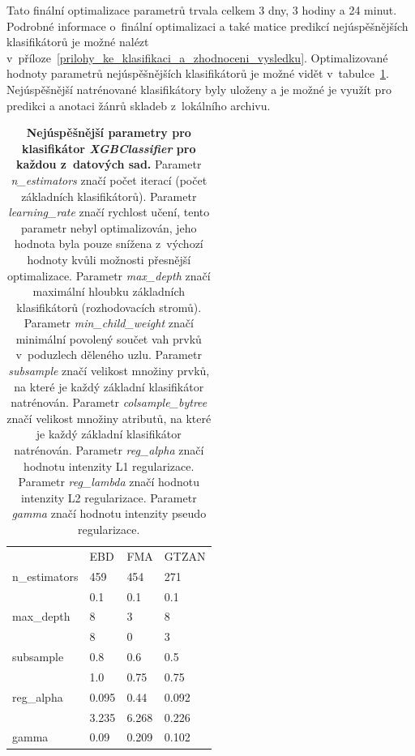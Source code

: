 Tato finální optimalizace parametrů trvala celkem 3 dny, 3 hodiny a 24 minut. Podrobné informace o~finální optimalizaci a také matice predikcí nejúspěšnějších klasifikátorů je možné nalézt v~příloze~\ref{prilohy_ke_klasifikaci_a_zhodnoceni_vysledku}. Optimalizované hodnoty parametrů nejúspěšnějších klasifikátorů je možné vidět v~tabulce~\ref{best_parameters}. Nejúspěšnější natrénované klasifikátory byly uloženy a je možné je využít pro predikci a anotaci žánrů skladeb z~lokálního archivu.

\begin{table}[H]
	\vskip6pt
    \caption{\textbf{Nejúspěšnější parametry pro klasifikátor \textit{XGBClassifier} pro každou z~datových sad.} Parametr \textit{n\_estimators} značí počet iterací (počet základních klasifikátorů). Parametr \textit{learning\_rate} značí rychlost učení, tento parametr nebyl optimalizován, jeho hodnota byla pouze snížena z~výchozí hodnoty kvůli možnosti přesnější optimalizace. Parametr \textit{max\_depth} značí maximální hloubku základních klasifikátorů (rozhodovacích stromů). Parametr \textit{min\_child\_weight} značí minimální povolený součet vah prvků v~poduzlech děleného uzlu. Parametr \textit{subsample} značí velikost množiny prvků, na které je každý základní klasifikátor natrénován. Parametr \textit{colsample\_bytree} značí velikost množiny atributů, na které je každý základní klasifikátor natrénován. Parametr \textit{reg\_alpha} značí hodnotu intenzity L1 regularizace.  Parametr \textit{reg\_lambda} značí hodnotu intenzity L2 regularizace. Parametr \textit{gamma} značí hodnotu intenzity pseudo regularizace.}
    \label{best_parameters}  
    \vskip6pt
	\centering
    \begin{tabular}{llll}
                                                                    & EBD   & FMA   & GTZAN \\ \cline{2-4} 
    \multicolumn{1}{l|}{n\_estimators}                              & 459   & 454   & 271   \\
    \rowcolor[HTML]{EFEFEF} 
    \multicolumn{1}{l|}{\cellcolor[HTML]{EFEFEF}learning\_rate}     & 0.1   & 0.1   & 0.1   \\
    \multicolumn{1}{l|}{max\_depth}                                 & 8     & 3     & 8     \\
    \rowcolor[HTML]{EFEFEF} 
    \multicolumn{1}{l|}{\cellcolor[HTML]{EFEFEF}min\_child\_weight} & 8     & 0     & 3     \\
    \multicolumn{1}{l|}{subsample}                                  & 0.8   & 0.6   & 0.5   \\
    \rowcolor[HTML]{EFEFEF} 
    \multicolumn{1}{l|}{\cellcolor[HTML]{EFEFEF}colsample\_bytree}  & 1.0   & 0.75  & 0.75  \\
    \multicolumn{1}{l|}{reg\_alpha}                                 & 0.095 & 0.44  & 0.092 \\
    \rowcolor[HTML]{EFEFEF} 
    \multicolumn{1}{l|}{\cellcolor[HTML]{EFEFEF}reg\_lambda}        & 3.235 & 6.268 & 0.226 \\
    \multicolumn{1}{l|}{gamma}                                      & 0.09  & 0.209 & 0.102
    \end{tabular}
    \end{table}

